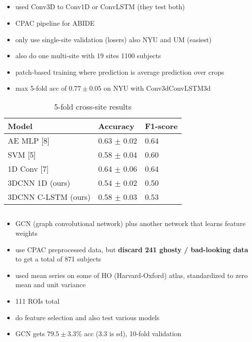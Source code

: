 \documentclass[10pt]{article}
\begin{document}
\subsection{\citet{el-gazzarHybrid3DCNN3DCLSTM2019}}

\begin{itemize}
  \item used Conv3D to Conv1D or ConvLSTM (they test both)
  \item CPAC pipeline for ABIDE
  \item only use single-site validation (losers) also NYU and UM (easiest)
  \item also do one multi-site with 19 sites 1100 subjects
  \item patch-based training where prediction is average prediction over crops
  \item max 5-fold acc of \(0.77 \pm 0.05\) on NYU with Conv3dConvLSTM3d
\end{itemize}

\begin{table}
\caption{\citet{el-gazzarHybrid3DCNN3DCLSTM2019} 5-fold cross-site results}
\centering
  \begin{tabular}{lll}
    \toprule
    Model     & Accuracy     & F1-score \\
    \midrule
    AE MLP        [8]   &  0.63 \(\pm\) 0.02  & 0.64 \\
    SVM           [5]   &  0.58 \(\pm\) 0.04  & 0.60 \\
    1D Conv       [7]   &  0.64 \(\pm\) 0.06  & 0.64 \\
    3DCNN 1D     (ours) &  0.54 \(\pm\) 0.02  & 0.50 \\
    3DCNN C-LSTM (ours) &  0.58 \(\pm\) 0.03  & 0.53 \\

    \bottomrule
  \end{tabular}
  \label{tab:table}
\end{table}

\subsection{\citet{shaoClassificationASDBased2021}}

\begin{itemize}
  \item GCN (graph convolutional network) plus another network that learns feature weights
  \item use CPAC preprocessed data, but \textbf{discard 241 ghosty / bad-looking data} to get a
  total of 871 subjects
  \item used mean series on some of HO (Harvard-Oxford) atlas, standardized to zero mean and unit variance
  \item 111 ROIs total
  \item do feature selection and also test various models
  \item GCN gets \(79.5\pm3.3\)\% acc (3.3 is sd), 10-fold validation
\end{itemize}
\end{document}
